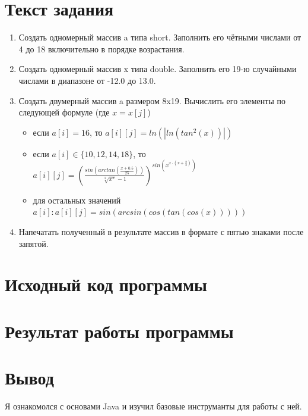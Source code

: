 \documentclass{article}
\begin{document}

\section*{Текст задания}

\begin{enumerate}
  \item Создать одномерный массив a типа short. Заполнить его чётными числами от 4 до 18 включительно в порядке возрастания.
  \item Создать одномерный массив x типа double. Заполнить его 19-ю случайными числами в диапазоне от -12.0 до 13.0.
  \item Создать двумерный массив a размером 8x19. Вычислить его элементы по следующей формуле (где $x = x[j]$) \begin{itemize}
          \item если $a[i] = 16$, то $\displaystyle a[i][j] = ln(|ln(tan^2(x))|)$
          \item если $a[i] \in \{10, 12, 14, 18\}$, то $\displaystyle
                  a[i][j] = \left(
                  \frac{
                    sin\left(arctan\left(\frac{x+0.5}{25}\right)\right)
                  }{
                    \sqrt[3]{x^x}-1
                  }
                  \right)^{
                    sin\left(x^{x\cdot\left(x+\frac{2}{3}\right)}\right)
                  }
                $
          \item для остальных значений $\displaystyle a[i]: a[i][j]=sin(arcsin(cos(tan(cos(x)))))$
        \end{itemize}
  \item Напечатать полученный в результате массив в формате с пятью знаками после запятой.
\end{enumerate}

\section*{Исходный код программы}


\section*{Результат работы программы}


\section*{Вывод}
Я ознакомолся с основами Java и изучил базовые инструманты для работы с ней.
\end{document}
